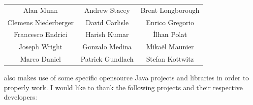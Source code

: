 \documentclass[a4paper,twoside,12pt]{memoir}
\begin{document}
\begin{mdframed}[roundcorner=10pt,linecolor=araracolor,middlelinewidth=1pt]
\centering
{\renewcommand{\arraystretch}{1.5}
\sffamily
\begin{tabular}{ccc}
Alan Munn & Andrew Stacey & Brent Longborough\\
Clemens Niederberger & David Carlisle & Enrico Gregorio\\
Francesco Endrici & Harish Kumar & \.Ilhan Polat\\
Joseph Wright & Gonzalo Medina & Mikaël Maunier\\
Marco Daniel & Patrick Gundlach & Stefan Kottwitz
\end{tabular}}
\end{mdframed}

\vspace{1em}

\noindent\arara also makes use of some specific opensource Java projects and libraries in order to properly
work. I would like to thank the following projects and their respective developers:
\end{document}
